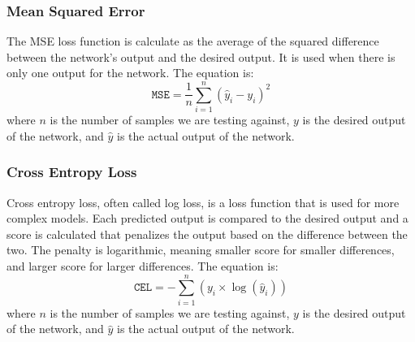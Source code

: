 \documentclass[titlepage]{article}
\begin{document}
\subsubsection{Mean Squared Error}
The MSE loss function is calculate as the average of the squared difference between the network's output and the desired output. It is used when there is only one output for the network. The equation is:
\begin{equation}
    \texttt{MSE} = \frac{1}{n} \sum_{i=1}^{n} (\hat{y}_i - y_i)^2
    \label{eq:MSE}
\end{equation}
where $n$ is the number of samples we are testing against, $y$ is the desired output of the network, and $\hat{y}$ is the actual output of the network.

\subsubsection{Cross Entropy Loss}
Cross entropy loss, often called log loss, is a loss function that is used for more complex models. Each predicted output is compared to the desired output and a score is calculated that penalizes the output based on the difference between the two. The penalty is logarithmic, meaning smaller score for smaller differences, and larger score for larger differences. The equation is:
\begin{equation}
    \texttt{CEL} = -\sum_{i=1}^{n}(y_i\times\log(\hat{y}_i))
    \label{eq:CEL}
\end{equation}
where $n$ is the number of samples we are testing against, $y$ is the desired output of the network, and $\hat{y}$ is the actual output of the network.
\end{document}
